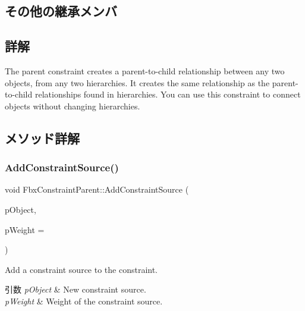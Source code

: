 \subsection*{その他の継承メンバ}


\subsection{詳解}
The parent constraint creates a parent-\/to-\/child relationship between any two objects, from any two hierarchies. It creates the same relationship as the parent-\/to-\/child relationships found in hierarchies. You can use this constraint to connect objects without changing hierarchies. 

\subsection{メソッド詳解}
\mbox{\label{class_fbx_constraint_parent_af1cb13c89d62f1de2478a5a102fd5788}} 
\subsubsection{\texorpdfstring{Add\+Constraint\+Source()}{AddConstraintSource()}}
{\footnotesize\ttfamily void Fbx\+Constraint\+Parent\+::\+Add\+Constraint\+Source (\begin{DoxyParamCaption}\item[{\hyperlink{class_fbx_object}{Fbx\+Object} $\ast$}]{p\+Object,  }\item[{double}]{p\+Weight = {} }\end{DoxyParamCaption})}

Add a constraint source to the constraint. 
\begin{DoxyParams}{引数}
{\em p\+Object} & New constraint source. \\
\hline
{\em p\+Weight} & Weight of the constraint source. \\
\hline
\end{DoxyParams}
\mbox{\label{class_fbx_constraint_parent_af968ae8a08629c4c259ec70ce2697c0e}} 
